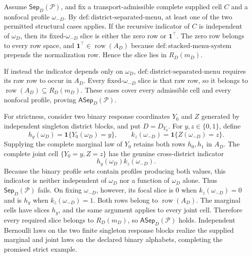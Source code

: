 Assume \(\mathsf{Sep}_D(\mathcal P)\), and fix a transport-admissible complete supplied cell \(C\) and a nonfocal profile \(\omega_{-D}\).  By \(\mathrm{def:district\text{-}separated\text{-}menu}\), at least one of the two permitted structural cases applies.  If the recursive indicator of \(C\) is independent of \(\omega_D\), then its fixed-\(\omega_{-D}\) slice is either the zero row or \(\mathbf 1^\top\).  The zero row belongs to every row space, and \(\mathbf 1^\top\in\operatorname{row}(A_D)\) because \(\mathrm{def:stacked\text{-}menu\text{-}system}\) prepends the normalization row.  Hence the slice lies in \(R_D(m_D)\).

If instead the indicator depends only on \(\omega_D\), \(\mathrm{def:district\text{-}separated\text{-}menu}\) requires its raw row to occur in \(A_D\).  Every fixed-\(\omega_{-D}\) slice is that raw row, so it belongs to \(\operatorname{row}(A_D)\subseteq R_D(m_D)\).  These cases cover every admissible cell and every nonfocal profile, proving \(\mathsf{ASep}_D(\mathcal P)\).

For strictness, consider two binary response coordinates \(Y_0\) and \(Z\) generated by independent singleton district blocks, and put \(D=D_{Y_0}\).  For \(y,z\in\{0,1\}\), define
\[
h_y(\omega_D)=\mathbf 1\{Y_0(\omega_D)=y\},
\qquad
k_z(\omega_{-D})=\mathbf 1\{Z(\omega_{-D})=z\}.
\]
Supplying the complete marginal law of \(Y_0\) retains both rows \(h_0,h_1\) in \(A_D\).  The complete joint cell \(\{Y_0=y,Z=z\}\) has the genuine cross-district indicator
\[
h_y(\omega_D)k_z(\omega_{-D}).
\]
Because the binary profile sets contain profiles producing both values, this indicator is neither independent of \(\omega_D\) nor a function of \(\omega_D\) alone.  Thus \(\mathsf{Sep}_D(\mathcal P)\) fails.  On fixing \(\omega_{-D}\), however, its focal slice is \(0\) when \(k_z(\omega_{-D})=0\) and is \(h_y\) when \(k_z(\omega_{-D})=1\).  Both rows belong to \(\operatorname{row}(A_D)\).  The marginal cells have slices \(h_y\), and the same argument applies to every joint cell.  Therefore every required slice belongs to \(R_D(m_D)\), so \(\mathsf{ASep}_D(\mathcal P)\) holds.  Independent Bernoulli laws on the two finite singleton response blocks realize the supplied marginal and joint laws on the declared binary alphabets, completing the promised strict example.
